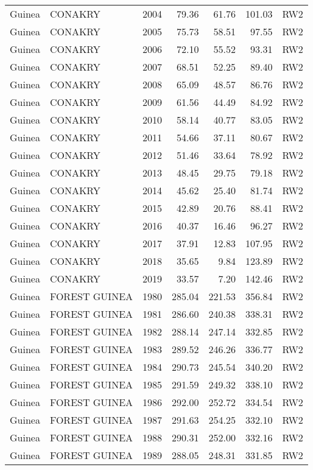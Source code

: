 \begin{longtable}{lllrrrl}
  Guinea & CONAKRY & 2004 & 79.36 & 61.76 & 101.03 & RW2 \\ 
  Guinea & CONAKRY & 2005 & 75.73 & 58.51 & 97.55 & RW2 \\ 
  Guinea & CONAKRY & 2006 & 72.10 & 55.52 & 93.31 & RW2 \\ 
  Guinea & CONAKRY & 2007 & 68.51 & 52.25 & 89.40 & RW2 \\ 
  Guinea & CONAKRY & 2008 & 65.09 & 48.57 & 86.76 & RW2 \\ 
  Guinea & CONAKRY & 2009 & 61.56 & 44.49 & 84.92 & RW2 \\ 
  Guinea & CONAKRY & 2010 & 58.14 & 40.77 & 83.05 & RW2 \\ 
  Guinea & CONAKRY & 2011 & 54.66 & 37.11 & 80.67 & RW2 \\ 
  Guinea & CONAKRY & 2012 & 51.46 & 33.64 & 78.92 & RW2 \\ 
  Guinea & CONAKRY & 2013 & 48.45 & 29.75 & 79.18 & RW2 \\ 
  Guinea & CONAKRY & 2014 & 45.62 & 25.40 & 81.74 & RW2 \\ 
  Guinea & CONAKRY & 2015 & 42.89 & 20.76 & 88.41 & RW2 \\ 
  Guinea & CONAKRY & 2016 & 40.37 & 16.46 & 96.27 & RW2 \\ 
  Guinea & CONAKRY & 2017 & 37.91 & 12.83 & 107.95 & RW2 \\ 
  Guinea & CONAKRY & 2018 & 35.65 & 9.84 & 123.89 & RW2 \\ 
  Guinea & CONAKRY & 2019 & 33.57 & 7.20 & 142.46 & RW2 \\ 
  Guinea & FOREST GUINEA & 1980 & 285.04 & 221.53 & 356.84 & RW2 \\ 
  Guinea & FOREST GUINEA & 1981 & 286.60 & 240.38 & 338.31 & RW2 \\ 
  Guinea & FOREST GUINEA & 1982 & 288.14 & 247.14 & 332.85 & RW2 \\ 
  Guinea & FOREST GUINEA & 1983 & 289.52 & 246.26 & 336.77 & RW2 \\ 
  Guinea & FOREST GUINEA & 1984 & 290.73 & 245.54 & 340.20 & RW2 \\ 
  Guinea & FOREST GUINEA & 1985 & 291.59 & 249.32 & 338.10 & RW2 \\ 
  Guinea & FOREST GUINEA & 1986 & 292.00 & 252.72 & 334.54 & RW2 \\ 
  Guinea & FOREST GUINEA & 1987 & 291.63 & 254.25 & 332.10 & RW2 \\ 
  Guinea & FOREST GUINEA & 1988 & 290.31 & 252.00 & 332.16 & RW2 \\ 
  Guinea & FOREST GUINEA & 1989 & 288.05 & 248.31 & 331.85 & RW2 \\ 

\end{longtable}

